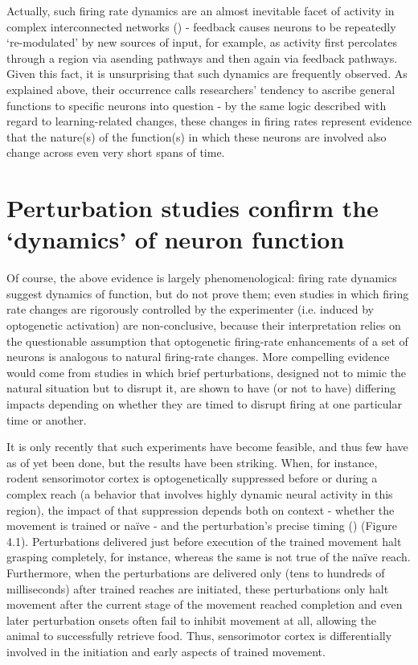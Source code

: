 \begin{refsection}
Actually, such firing rate dynamics are an almost inevitable facet of activity in complex interconnected networks (\cite{pandarinath2018a,yuste2015a}) - feedback causes neurons to be repeatedly ‘re-modulated’ by new sources of input, for example, as activity first percolates through a region via asending pathways and then again via feedback pathways. Given this fact, it is unsurprising that such dynamics are frequently observed. As explained above, their occurrence calls researchers’ tendency to ascribe general functions to specific neurons into question - by the same logic described with regard to learning-related changes, these changes in firing rates represent evidence that the nature(s) of the function(s) in which these neurons are involved also change across even very short spans of time.

\section{Perturbation studies confirm the ‘dynamics’ of neuron function}
Of course, the above evidence is largely phenomenological: firing rate dynamics suggest dynamics of function, but do not prove them; even studies in which firing rate changes are rigorously controlled by the experimenter (i.e. induced by optogenetic activation) are non-conclusive, because their interpretation relies on the questionable assumption that optogenetic firing-rate enhancements of a set of neurons is analogous to natural firing-rate changes. More compelling evidence would come from studies in which brief perturbations, designed not to mimic the natural situation but to disrupt it, are shown to have (or not to have) differing impacts depending on whether they are timed to disrupt firing at one particular time or another.

It is only recently that such experiments have become feasible, and thus few have as of yet been done, but the results have been striking. When, for instance, rodent sensorimotor cortex is optogenetically suppressed before or during a complex reach (a behavior that involves highly dynamic neural activity in this region), the impact of that suppression depends both on context - whether the movement is trained or naïve - and the perturbation’s precise timing (\cite{guo2015a}) (Figure 4.1). Perturbations delivered just before execution of the trained movement halt grasping completely, for instance, whereas the same is not true of the naïve reach. Furthermore, when the perturbations are delivered only (tens to hundreds of milliseconds) after trained reaches are initiated, these perturbations only halt movement after the current stage of the movement reached completion and even later perturbation onsets often fail to inhibit movement at all, allowing the animal to successfully retrieve food. Thus, sensorimotor cortex is differentially involved in the initiation and early aspects of trained movement.


\end{refsection}

